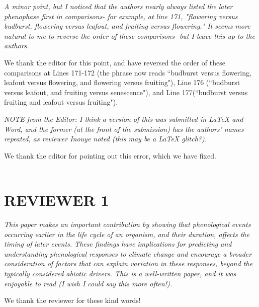 \documentclass[10.95pt,a4paper]{letter}
\begin{document}
\emph{ A minor point, but I noticed that the authors nearly always listed the later phenophase first in comparisons- for example, at line 171, "flowering versus budburst, flowering versus leafout, and fruiting versus flowering."  It seems more natural to me to reverse the order of these comparisons- but I leave this up to the authors.}  
\par We thank the editor for this point, and have reversed the order of these comparisons at Lines 171-172 (the phrase now reads ``budburst versus flowering, leafout versus flowering, and flowering versus fruiting"), Line 176 (``budburst versus leafout, and fruiting versus senescence"), and Line 177(``budburst versus fruiting and leafout versus fruiting"). 
\par \emph{NOTE from the Editor: I think a version of this was submitted in LaTeX and Word, and the former (at the front of the submission) has the authors' names repeated, as reviewer Inouye noted (this may be a LaTeX glitch?).}
\par We thank the editor for pointing out this error, which we have fixed. 
\\
\\
\section {REVIEWER 1}
\par \emph{This paper makes an important contribution by showing that phenological events occurring earlier in the life cycle of an organism, and their duration, affects the timing of later events.  These findings have implications for predicting and understanding phenological responses to climate change and encourage a broader consideration of factors that can explain variation in these responses, beyond the typically considered abiotic drivers. This is a well-written paper, and it was enjoyable to read (I wish I could say this more often!).}
\par We thank the reviewer for these kind words!
\end{document}
